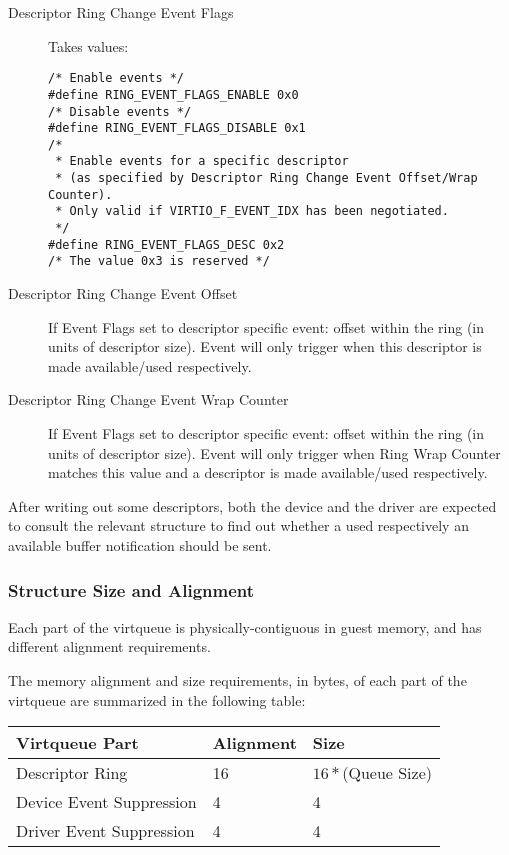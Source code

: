 \begin{description}
\item [Descriptor Ring Change Event Flags] Takes values:
\begin{lstlisting}
/* Enable events */
#define RING_EVENT_FLAGS_ENABLE 0x0
/* Disable events */
#define RING_EVENT_FLAGS_DISABLE 0x1
/*
 * Enable events for a specific descriptor
 * (as specified by Descriptor Ring Change Event Offset/Wrap Counter).
 * Only valid if VIRTIO_F_EVENT_IDX has been negotiated.
 */
#define RING_EVENT_FLAGS_DESC 0x2
/* The value 0x3 is reserved */
\end{lstlisting}
\item [Descriptor Ring Change Event Offset] If Event Flags set to descriptor
specific event: offset within the ring (in units of descriptor
size). Event will only trigger when this descriptor is
made available/used respectively.
\item [Descriptor Ring Change Event Wrap Counter] If Event Flags set to descriptor
specific event: offset within the ring (in units of descriptor
size). Event will only trigger when Ring Wrap Counter
matches this value and a descriptor is
made available/used respectively.
\end{description}

After writing out some descriptors, both the device and the driver
are expected to consult the relevant structure to find out
whether a used respectively an available buffer notification should be sent.

\subsubsection{Structure Size and Alignment}
\label{sec:Packed Virtqueues / Structure Size and Alignment}

Each part of the virtqueue is physically-contiguous in guest memory,
and has different alignment requirements.

The memory alignment and size requirements, in bytes, of each part of the
virtqueue are summarized in the following table:

\begin{tabular}{|l|l|l|}
\hline
Virtqueue Part    & Alignment & Size \\
\hline \hline
Descriptor Ring  & 16        & $16 * $(Queue Size) \\
\hline
Device Event Suppression    & 4         & 4 \\
 \hline
Driver Event Suppression         & 4         & 4 \\
 \hline
\end{tabular}

